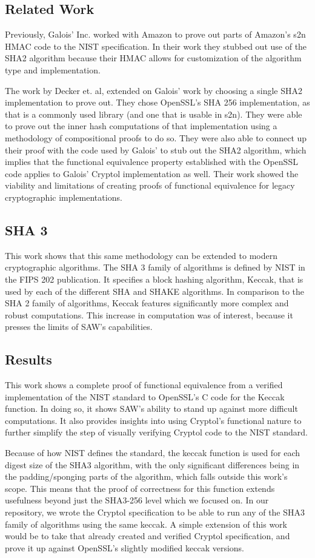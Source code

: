 \subsection{Related Work}
  Previously, Galois' Inc. worked with Amazon to prove out parts of Amazon's s2n HMAC code to the NIST specification.  
In their work they stubbed out use of the SHA2 algorithm because their HMAC allows for customization of the algorithm type and implementation.

The work by Decker et. al, extended on Galois' work by choosing a single SHA2 implementation to prove out.  
They chose OpenSSL's SHA 256 implementation, as that is a commonly used library (and one that is usable in s2n).  
They were able to prove out the inner hash computations of that implementation using a methodology of compositional proofs to do so.  
They were also able to connect up their proof with the code used by Galois' to stub out the SHA2 algorithm, which implies that the functional equivalence property established with the OpenSSL code applies to Galois' Cryptol implementation as well.  
Their work showed the viability and limitations of creating proofs of functional equivalence for legacy cryptographic implementations.



\subsection{SHA 3}
This work shows that this same methodology can be extended to modern cryptographic algorithms.
The SHA 3 family of algorithms is defined by NIST in the FIPS 202 publication.
It specifies a block hashing algorithm, Keccak, that is used by each of the different SHA and SHAKE algorithms.
In comparison to the SHA 2 family of algorithms, Keccak features significantly more complex and robust computations.
This increase in computation was of interest, because it presses the limits of SAW's capabilities.

\subsection{Results}
This work shows a complete proof of functional equivalence from a verified implementation of the NIST standard to OpenSSL's C code for the Keccak function.
In doing so, it shows SAW's ability to stand up against more difficult computations.
It also provides insights into using Cryptol's functional nature to further simplify the step of visually verifying Cryptol code to the NIST standard.

Because of how NIST defines the standard, the keccak function is used for each digest size of the SHA3 algorithm, with the only significant differences being in the padding/sponging parts of the algorithm, which falls outside this work's scope.
This means that the proof of correctness for this function extends usefulness beyond just the SHA3-256 level which we focused on.
In our repository, we wrote the Cryptol specification to be able to run any of the SHA3 family of algorithms using the same keccak.
A simple extension of this work would be to take that already created and verified Cryptol specification, and prove it up against OpenSSL's slightly modified keccak versions.